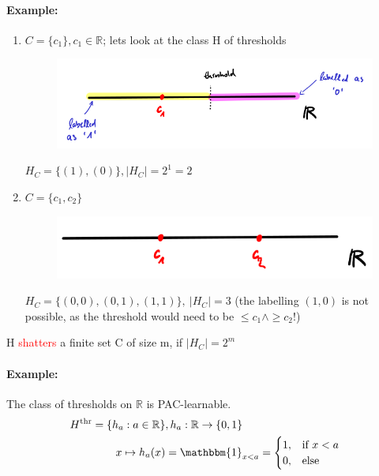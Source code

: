 \documentclass[10pt,a4paper]{article}
\theoremstyle{remark}
\theoremstyle{definition}
\theoremstyle{plain}
\begin{document}
\paragraph{Example:}
\begin{enumerate}
	\item $C = \{c_1\}, c_1 \in \mathbb{R}$; lets look at the class H of thresholds
	\begin{figure}[H]
		\centering
		\includegraphics[width=0.9\linewidth]{sketch_3}
		\label{fig:sketch3}
	\end{figure}
	$ H_C = \{(1), (0)\}, |H_C| = 2^1 = 2$
	\item $C = \{c_1, c_2\}$
		\begin{figure}[H]
			\centering
			\includegraphics[width=0.7\linewidth]{sketch_3-2}
			\label{fig:sketch3-2}
		\end{figure}
		$ H_C = \{(0,0), (0,1), (1,1)\}, \ |H_C| = 3 $ (the labelling $(1,0)$ is not possible, as the threshold would need to be $\leq c_1 \land \geq c_2$!)
\end{enumerate}

\begin{boxedsubdef}
	H \textcolor{red}{shatters} a finite set C of size m, if $|H_C| = 2^m$
\end{boxedsubdef}

\paragraph{Example:}
The class of thresholds on $\mathbb{R}$ is PAC-learnable.
\begin{align*}
	H^{\text{thr}} = \{h_a: a \in \mathbb{R}\}&, h_a: \mathbb{R}\to\{0,1\}\\
	x \mapsto h_a(x) &= \mathbbm{1}_{x<a} = 
	\begin{cases}
		1 , &  \text{if } x<a \\
		0 , &  \text{else} 
	\end{cases}
\end{align*}
\end{document}
